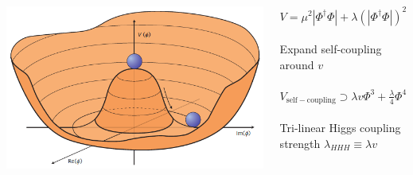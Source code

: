 \documentclass{beamer}
\newcommand*{\header}[1]{\fontsize{16}{8}\selectfont \textbf{{\color{MyPurple}{#1}}}}
\begin{document}
\begin{frame}
\begin{columns}
\begin{column}{0.5\textwidth}
\begin{center}
\end{center}
\end{column}
\end{columns}
\end{frame}

\begin{frame}
\begin{center}
\header{Higgs Self-Coupling}
\end{center}
\begin{columns}
\begin{column}{0.5\textwidth}
\includegraphics[width=1\textwidth]{figures/higgspotential}
\end{column}
\begin{column}{0.5\textwidth}
\color{MyPurple}{Higgs Potential}\color{black}
\begin{center}
$V = \mu^2|\Phi^{\dagger}\Phi| + \lambda(|\Phi^{\dagger}\Phi|)^2$\\~\\
Expand self-coupling around $v$\\~\\
$V_\mathrm{self-coupling} \supset{} \lambda{}v\Phi^3 + \frac{\lambda}{4}\Phi^4$\\~\\
Tri-linear Higgs coupling strength $\lambda_{HHH}\equiv{}\lambda v$
\end{center}
\end{column}
\end{columns}
\end{frame}
\end{document}
